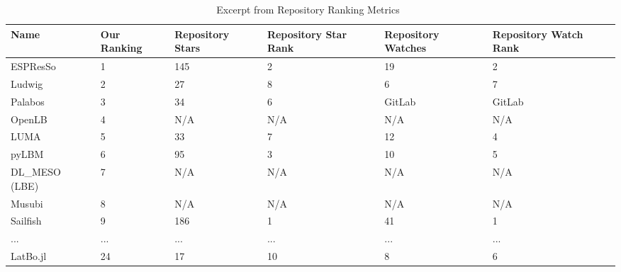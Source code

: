 \documentclass[runningheads]{llncs}
\begin{document}
\begin{table}[!ht]
	\begin{center}
		\begin{tabular}{ p{3cm}p{1.25cm}p{1.75cm}p{1.75cm}p{1.75cm}p{1.75cm} }
			\toprule
			Name & Our Ranking & Repository Stars & Repository Star Rank &
			Repository Watches & Repository Watch Rank\\
			\midrule
			ESPResSo & 1 & 145 & 2 & 19& 2\\
			Ludwig & 2 & 27 & 8 & 6& 7\\
			Palabos & 3 & 34 & 6 & GitLab& GitLab\\
			OpenLB & 4 & N/A & N/A & N/A& N/A\\
			LUMA & 5 & 33 & 7 & 12& 4\\
			pyLBM & 6 & 95 & 3 & 10& 5\\
			DL\_MESO (LBE) & 7 & N/A & N/A & N/A & N/A\\
			Musubi & 8 & N/A & N/A & N/A & N/A\\
			Sailfish & 9 & 186 & 1 & 41& 1\\
			... & ... & ... & ... & ... & ...\\				
			LatBo.jl & 24 & 17 & 10 & 8& 6\\			
			\bottomrule
		\end{tabular}
		\caption{Excerpt from Repository Ranking Metrics~\cite{Michalski2021}}
		\label{repometrics}
	\end{center}
	\end{table}
\end{document}
